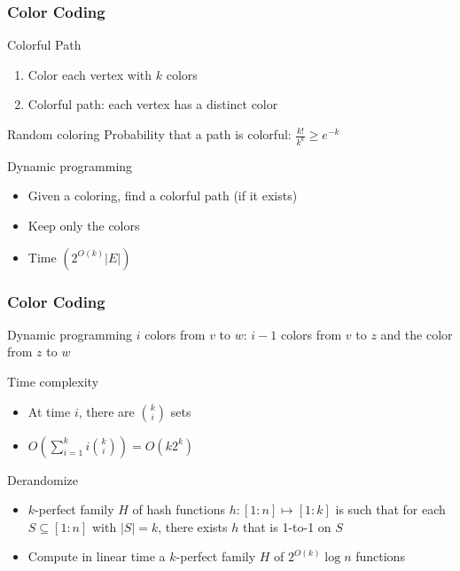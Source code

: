 \documentclass[12pt,aspectratio=169]{beamer}
\begin{document}
\begin{frame}\frametitle{Color Coding }
  \begin{block}{Colorful Path}
    \begin{enumerate}
    \item
      Color each vertex with $k$ colors
    \item
      Colorful path: each vertex has a distinct color
    \end{enumerate}
  \end{block}

  \begin{block}{Random coloring}
    Probability that a path is colorful: $\frac{k!}{k^{k}} \ge e^{-k}$
  \end{block}

  \begin{block}{Dynamic programming}
    \begin{itemize}
      \item
        Given a coloring, find a colorful path (if it exists)
      \item
        Keep only the colors
      \item
        Time $(2^{O(k)}|E|)$
      \end{itemize}
    \end{block}
\end{frame} 

\begin{frame}\frametitle{Color Coding }
  \begin{block}{Dynamic programming}
    $i$ colors from $v$ to $w$:
    $i-1$ colors from $v$ to $z$ and the color from $z$ to $w$
  \end{block}

  \begin{block}{Time complexity}
    \begin{itemize}
      \item
    At time $i$, there are $k \choose i$ sets
  \item
    $O(\sum_{i=1}^{k} i {k \choose i}) = O(k 2^{k})$
  \end{itemize}
\end{block}
  \begin{block}{Derandomize}
    \begin{itemize}
    \item
      $k$-perfect family $H$ of hash functions $h:[1:n]\mapsto [1:k]$ is such that for
      each $S\subseteq [1:n]$ with $|S|=k$, there exists $h$ that is 1-to-1 on $S$
    \item
      Compute in linear time a $k$-perfect family $H$ of $2^{O(k)}\log n$ functions
    \end{itemize}
  \end{block}
\end{frame}
\end{document}
